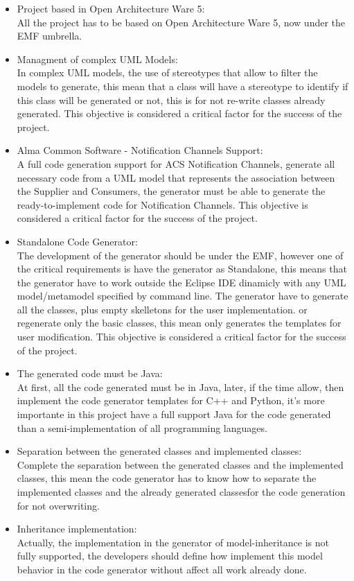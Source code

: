 \begin{itemize}
\item Project based in Open Architecture Ware 5:\\
All the project has to be based on Open Architecture Ware 5, now under the EMF
umbrella.
 
\item Managment of complex UML Models:\\
In complex UML models, the use of stereotypes that allow to filter the models
to generate, this mean that a class will have a stereotype to identify if this
class will be generated or not, this is for not re-write classes already
generated. This objective is considered a critical factor for the success of
the project.

\item Alma Common Software - Notification Channels Support:\\ 
A full code generation support for ACS Notification Channels, generate all
necessary code from a UML model that represents the association between the
Supplier and Consumers, the generator must be able to generate the
ready-to-implement code for Notification Channels. This objective is
considered a critical factor for the success of the project.

\item Standalone Code Generator: \\
The development of the generator should be under the EMF, however one of the
critical requirements is have the generator as Standalone, this means that the
generator have to work outside the Eclipse IDE dinamicly with any UML
model/metamodel specified by command line. The generator have to generate all
the classes, plus empty skelletons for the user implementation. or regenerate
only the basic classes, this mean only generates the templates for user
modification. This objective is considered a critical factor for the success
of the project.

\item The generated code must be Java:\\ 
At first, all the code generated must be in Java, later, if the time allow,
then implement the code generator templates for C++ and Python, it's more
importante in this project have a full support Java for the code generated
than a semi-implementation of all programming languages.

\item Separation between the generated classes and implemented classes:\\
Complete the separation between the generated classes and the implemented
classes, this mean the code generator has to know how to separate the
implemented classes and the already generated classesfor the code generation
for not overwriting.

\item Inheritance implementation:\\
Actually, the implementation in the generator of model-inheritance is not fully
supported, the developers should define how implement this model behavior in
the code generator without affect all work already done.
\end{itemize}

